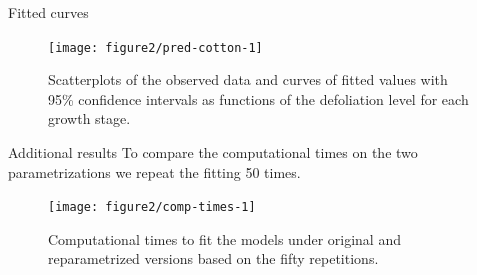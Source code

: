 \documentclass[11pt]{beamer}\usepackage[]{graphicx}\usepackage[]{color}
\begin{document}
\begin{frame}{Fitted curves}

\begin{figure}[!htb]

{\centering \texttt{[image: figure2/pred-cotton-1]} 

}

\caption[Scatterplots of the observed data and curves of fitted values with 95\% confidence intervals as functions of the defoliation level for each growth stage]{Scatterplots of the observed data and curves of fitted values with 95\% confidence intervals as functions of the defoliation level for each growth stage.}\label{fig:pred-cotton}
\end{figure}



\end{frame}

\begin{frame}{Additional results}
  \small
  To compare the computational times on the two parametrizations we
  repeat the fitting 50 times.
  \vspace{-0.2cm}

\begin{figure}[!htb]

{\centering \texttt{[image: figure2/comp-times-1]} 

}

\caption[Computational times to fit the models under original and reparametrized versions based on the fifty repetitions]{Computational times to fit the models under original and reparametrized versions based on the fifty repetitions.}\label{fig:comp-times}
\end{figure}



\end{frame}
\end{document}
